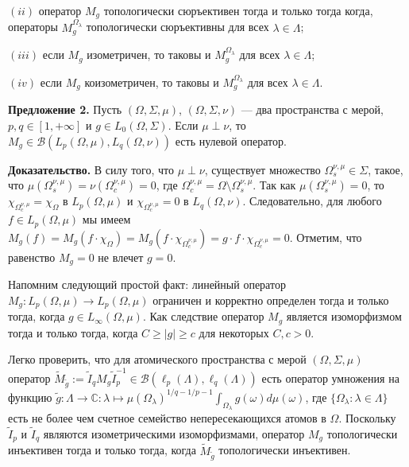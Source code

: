 \documentclass[11pt,twoside]{article}
\begin{document}
$(ii)$ оператор $M_g$ топологически сюръективен тогда и только тогда когда,
операторы $M_g^{\Omega_\lambda}$ топологически сюръективны для всех
$\lambda\in\Lambda$;

$(iii)$ если $M_g$ изометричен, то таковы и $M_g^{\Omega_\lambda}$ для всех
$\lambda\in\Lambda$;

$(iv)$ если $M_g$ коизометричен, то таковы и $M_g^{\Omega_\lambda}$ для всех
$\lambda\in\Lambda$.

\textbf{Предложение 2.} Пусть $(\Omega,\Sigma,\mu)$, $(\Omega,\Sigma,\nu)$ ---
два пространства с мерой, $p,q\in[1,+\infty]$ и $g\in L_0(\Omega,\Sigma)$. Если
$\mu\perp\nu$, то $M_g\in\mathcal{B}(L_p(\Omega,\mu), L_q(\Omega,\nu))$ есть
нулевой оператор.

\textbf{Доказательство.} В силу того, что $\mu\perp\nu$, существует множество
$\Omega_s^{\nu,\mu}\in\Sigma$, такое, что
$\mu(\Omega_s^{\nu,\mu})=\nu(\Omega_c^{\nu,\mu})=0$, где
$\Omega_c^{\nu,\mu}=\Omega\setminus\Omega_s^{\nu,\mu}$. Так как
$\mu(\Omega_s^{\nu,\mu})=0$, то  $\chi_{\Omega_c^{\nu,\mu}}=\chi_{\Omega}$ в
$L_p(\Omega,\mu)$ и  $\chi_{\Omega_c^{\nu,\mu}}=0$ в $L_q(\Omega,\nu)$.
Следовательно, для любого $f\in L_p(\Omega,\mu)$ мы имеем $M_g(f)=M_g(f\cdot
    \chi_{\Omega})=M_g(f\cdot \chi_{\Omega_c^{\nu,\mu}})=g\cdot
    f\cdot\chi_{\Omega_c^{\nu,\mu}}=0$. Отметим, что равенство  $M_g=0$ не влечет
$g=0$.

























Напомним следующий простой факт: линейный оператор
$M_g:L_p(\Omega,\mu)\to L_p(\Omega,\mu)$ ограничен и корректно определен тогда
и только тогда, когда $g\in L_\infty(\Omega,\mu)$. Как следствие оператор
$M_g$ является изоморфизмом тогда и только тогда, когда $C\geq |g|\geq c$ для
некоторых $C,c>0$.

Легко проверить, что для атомического пространства с мерой $(\Omega,\Sigma,\mu)$
оператор $\widetilde{M}_{\widetilde{g}}:=\widetilde{I}_q
    M_g\widetilde{I}_p^{-1}\in\mathcal{B}(\ell_p(\Lambda),\ell_q(\Lambda))$ есть
оператор умножения на функцию $\widetilde{g}:\Lambda\to\mathbb{C}:\lambda\mapsto
    {\mu(\Omega_\lambda)}^{1/q-1/p-1}\int_{\Omega_\lambda}g(\omega)d\mu(\omega)$,
где $\{\Omega_\lambda:\lambda\in\Lambda \}$ есть не более чем счетное семейство
непересекающихся атомов в $\Omega$. Поскольку $\widetilde{I}_p$ и
$\widetilde{I}_q$  являются изометрическими изоморфизмами, оператор $M_g$
топологически инъективен тогда и только тогда, когда
$\widetilde{M}_{\widetilde{g}}$ топологически инъективен.
\end{document}

